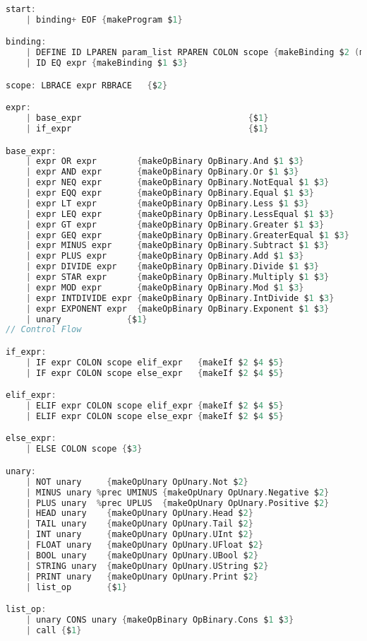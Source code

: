 \documentclass{l4proj}
\begin{document}
\begin{appendices}
\begin{lstlisting}[language=C, label=lst:parser-spec, caption=PyFunc's full parser specification for Menhir.]
%%
start:
    | binding+ EOF {makeProgram $1}

binding:
    | DEFINE ID LPAREN param_list RPAREN COLON scope {makeBinding $2 (makeFunc $2 $4 $7)}
    | ID EQ expr {makeBinding $1 $3}

scope: LBRACE expr RBRACE   {$2}

expr:
    | base_expr                                 {$1}
    | if_expr                                   {$1}

base_expr:
    | expr OR expr        {makeOpBinary OpBinary.And $1 $3}
    | expr AND expr       {makeOpBinary OpBinary.Or $1 $3}
    | expr NEQ expr       {makeOpBinary OpBinary.NotEqual $1 $3}
    | expr EQQ expr       {makeOpBinary OpBinary.Equal $1 $3}
    | expr LT expr        {makeOpBinary OpBinary.Less $1 $3}
    | expr LEQ expr       {makeOpBinary OpBinary.LessEqual $1 $3}
    | expr GT expr        {makeOpBinary OpBinary.Greater $1 $3}
    | expr GEQ expr       {makeOpBinary OpBinary.GreaterEqual $1 $3}
    | expr MINUS expr     {makeOpBinary OpBinary.Subtract $1 $3}
    | expr PLUS expr      {makeOpBinary OpBinary.Add $1 $3}
    | expr DIVIDE expr    {makeOpBinary OpBinary.Divide $1 $3}
    | expr STAR expr      {makeOpBinary OpBinary.Multiply $1 $3}
    | expr MOD expr       {makeOpBinary OpBinary.Mod $1 $3}
    | expr INTDIVIDE expr {makeOpBinary OpBinary.IntDivide $1 $3}
    | expr EXPONENT expr  {makeOpBinary OpBinary.Exponent $1 $3}
    | unary             {$1}
// Control Flow

if_expr:
    | IF expr COLON scope elif_expr   {makeIf $2 $4 $5}
    | IF expr COLON scope else_expr   {makeIf $2 $4 $5}

elif_expr:
    | ELIF expr COLON scope elif_expr {makeIf $2 $4 $5}
    | ELIF expr COLON scope else_expr {makeIf $2 $4 $5}

else_expr:
    | ELSE COLON scope {$3}

unary:
    | NOT unary     {makeOpUnary OpUnary.Not $2}
    | MINUS unary %prec UMINUS {makeOpUnary OpUnary.Negative $2}
    | PLUS unary  %prec UPLUS  {makeOpUnary OpUnary.Positive $2}
    | HEAD unary    {makeOpUnary OpUnary.Head $2}
    | TAIL unary    {makeOpUnary OpUnary.Tail $2}
    | INT unary     {makeOpUnary OpUnary.UInt $2}
    | FLOAT unary   {makeOpUnary OpUnary.UFloat $2}
    | BOOL unary    {makeOpUnary OpUnary.UBool $2}
    | STRING unary  {makeOpUnary OpUnary.UString $2}
    | PRINT unary   {makeOpUnary OpUnary.Print $2}
    | list_op       {$1}

list_op:
    | unary CONS unary {makeOpBinary OpBinary.Cons $1 $3}
    | call {$1}


\end{lstlisting}
\end{appendices}
\end{document}

